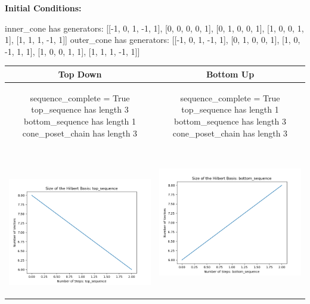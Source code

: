 \documentclass[10pt]{article}
\begin{document}
\textbf{Initial Conditions:}
\begin{SAGE}
inner_cone has generators: 
[[-1, 0, 1, -1, 1], [0, 0, 0, 0, 1], [0, 1, 0, 0, 1], [1, 0, 0, 1, 1], [1, 1, 1, -1, 1]]
outer_cone has generators: 
[[-1, 0, 1, -1, 1], [0, 1, 0, 0, 1], [1, 0, -1, 1, 1], [1, 0, 0, 1, 1], [1, 1, 1, -1, 1]]

\end{SAGE}
\begin{tabular}{c|c}
\textbf{Top Down} & \textbf{Bottom Up} \\ \hline  
\begin{SAGE}
	sequence_complete = True
	top_sequence has length 3
	bottom_sequence has length 1
	cone_poset_chain has length 3
\end{SAGE} 
&
\begin{SAGE}
	sequence_complete = True
	top_sequence has length 1
	bottom_sequence has length 3
	cone_poset_chain has length 3
\end{SAGE} 
\\ \hline
\
\begin{minipage}{.45\textwidth}
\includegraphics[width=\textwidth]{"DATA/5d/5 generators 1 bound F/top_sequence SIZE"}
\end{minipage} &
\begin{minipage}{.45\textwidth}
\includegraphics[width=\textwidth]{"DATA/5d/5 generators 1 bound F bottomup/bottom_sequence SIZE"}

\end{minipage}
\end{tabular}
\end{document}
